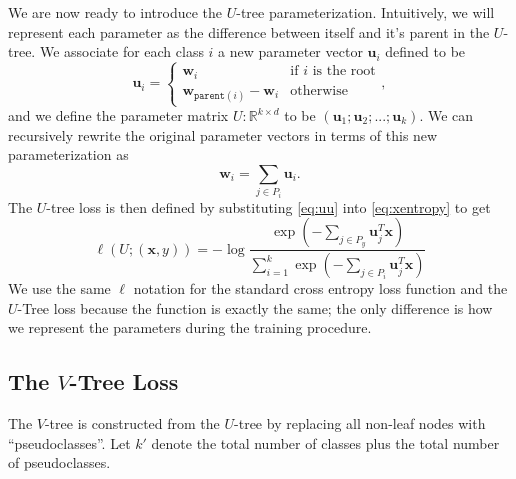 \documentclass[twoside]{article}
\newcommand{\parent}[1]{\texttt{parent}({#1})}
\newcommand{\trans}[1]{{#1}^{T}}
\newcommand{\uu}{\mathbf u}
\newcommand{\w}{\mathbf w}
\newcommand{\x}{\mathbf x}
\begin{document}
We are now ready to introduce the $U$-tree parameterization.
Intuitively, we will represent each parameter as the difference between itself and it's parent in the $U$-tree.
We associate for each class $i$ a new parameter vector $\uu_i$ defined to be
\begin{equation}
    \uu_i =
    \begin{cases}
        \w_i                    & \text{if $i$ is the root} \\
        \w_{\parent{i}} - \w_i  & \text{otherwise}
    \end{cases}
    ,
\end{equation}
and we define the parameter matrix $U : \mathbb R^{k\times d}$ to be $(\uu_1;\uu_2;...;\uu_k)$.
We can recursively rewrite the original parameter vectors in terms of this new parameterization as
\begin{equation}
    \w_i = \sum_{j\in P_i} \uu_i
    .
    \label{eq:uu}
\end{equation}
The $U$-tree loss is then defined by substituting \eqref{eq:uu} into \eqref{eq:xentropy} to get
\begin{equation*}
\ell(U;(\x,y)) = - \log \frac {\exp(-\sum_{j\in P_y}\trans\uu_j \x)}{\sum_{i=1}^k \exp(- \sum_{j\in P_i}\trans\uu_j \x)}
\end{equation*}
We use the same $\ell$ notation for the standard cross entropy loss function and the $U$-Tree loss because the function is exactly the same;
the only difference is how we represent the parameters during the training procedure.

\subsection{The $V$-Tree Loss}

The $V$-tree is constructed from the $U$-tree by replacing all non-leaf nodes with ``pseudoclasses''.
Let $k'$ denote the total number of classes plus the total number of pseudoclasses.
\end{document}
